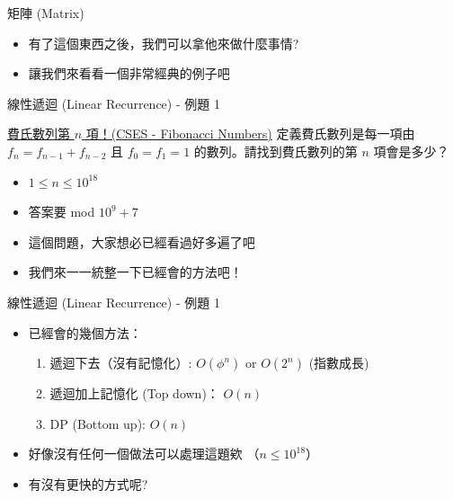 \documentclass[aspectratio=169]{beamer}
\begin{document}
    \begin{frame}{矩陣 (Matrix)}
        \begin{itemize}
            \item 有了這個東西之後，我們可以拿他來做什麼事情?
            \item 讓我們來看看一個非常經典的例子吧
        \end{itemize}
    \end{frame}
    
    \begin{frame}{線性遞迴 (Linear Recurrence) - 例題 1}
        \begin{block}{\href{https://cses.fi/problemset/task/1722}{費氏數列第 $n$ 項！(CSES - Fibonacci Numbers)}}
            定義費氏數列是每一項由 $f_n = f_{n-1} + f_{n-2}$ 且 $f_0 = f_1 = 1$ 的數列。請找到費氏數列的第 $n$ 項會是多少？ \\
            \begin{itemize}
                \item $1 \le n \le 10^{18}$
                \item 答案要 mod $10^9+7$
            \end{itemize}
        \end{block}
        \begin{itemize}
            \item<1-> 這個問題，大家想必已經看過好多遍了吧
            \item<2-> 我們來一一統整一下已經會的方法吧！
        \end{itemize}
    \end{frame}
    
    \begin{frame}{線性遞迴 (Linear Recurrence) - 例題 1}
        \begin{itemize}
            \item 已經會的幾個方法：
            \begin{enumerate}
                \item 遞迴下去（沒有記憶化）: $O(\phi^n)$ or $O(2^n)$ (指數成長)
                \item 遞迴加上記憶化 (Top down)： $O(n)$
                \item DP (Bottom up): $O(n)$
            \end{enumerate}
            \item<2-> 好像沒有任何一個做法可以處理這題欸 （$n \le 10^{18}$）
            \item<3-> 有沒有更快的方式呢?
        \end{itemize}
    \end{frame}
    
\end{document}
